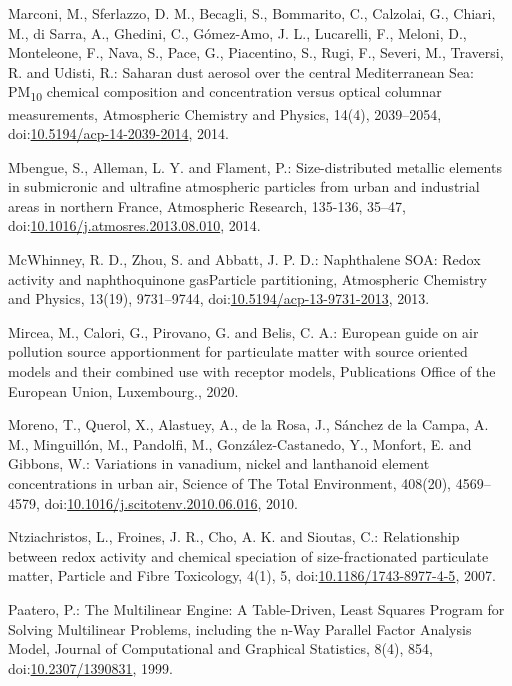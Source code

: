 \documentclass[
]{article}
\begin{document}
Marconi, M., Sferlazzo, D. M., Becagli, S., Bommarito, C., Calzolai, G.,
Chiari, M., di Sarra, A., Ghedini, C., Gómez-Amo, J. L., Lucarelli, F.,
Meloni, D., Monteleone, F., Nava, S., Pace, G., Piacentino, S., Rugi,
F., Severi, M., Traversi, R. and Udisti, R.: Saharan dust aerosol over
the central Mediterranean Sea: PM\textsubscript{10} chemical composition
and concentration versus optical columnar measurements, Atmospheric
Chemistry and Physics, 14(4), 2039--2054,
doi:\href{https://doi.org/10.5194/acp-14-2039-2014}{10.5194/acp-14-2039-2014},
2014.

Mbengue, S., Alleman, L. Y. and Flament, P.: Size-distributed metallic
elements in submicronic and ultrafine atmospheric particles from urban
and industrial areas in northern France, Atmospheric Research, 135-136,
35--47,
doi:\href{https://doi.org/10.1016/j.atmosres.2013.08.010}{10.1016/j.atmosres.2013.08.010},
2014.

McWhinney, R. D., Zhou, S. and Abbatt, J. P. D.: Naphthalene SOA: Redox
activity and naphthoquinone gasParticle partitioning, Atmospheric
Chemistry and Physics, 13(19), 9731--9744,
doi:\href{https://doi.org/10.5194/acp-13-9731-2013}{10.5194/acp-13-9731-2013},
2013.

Mircea, M., Calori, G., Pirovano, G. and Belis, C. A.: European guide on
air pollution source apportionment for particulate matter with source
oriented models and their combined use with receptor models,
Publications Office of the European Union, Luxembourg., 2020.

Moreno, T., Querol, X., Alastuey, A., de la Rosa, J., Sánchez de la
Campa, A. M., Minguillón, M., Pandolfi, M., González-Castanedo, Y.,
Monfort, E. and Gibbons, W.: Variations in vanadium, nickel and
lanthanoid element concentrations in urban air, Science of The Total
Environment, 408(20), 4569--4579,
doi:\href{https://doi.org/10.1016/j.scitotenv.2010.06.016}{10.1016/j.scitotenv.2010.06.016},
2010.

Ntziachristos, L., Froines, J. R., Cho, A. K. and Sioutas, C.:
Relationship between redox activity and chemical speciation of
size-fractionated particulate matter, Particle and Fibre Toxicology,
4(1), 5,
doi:\href{https://doi.org/10.1186/1743-8977-4-5}{10.1186/1743-8977-4-5},
2007.

Paatero, P.: The Multilinear Engine: A Table-Driven, Least Squares
Program for Solving Multilinear Problems, including the n-Way Parallel
Factor Analysis Model, Journal of Computational and Graphical
Statistics, 8(4), 854,
doi:\href{https://doi.org/10.2307/1390831}{10.2307/1390831}, 1999.
\end{document}
